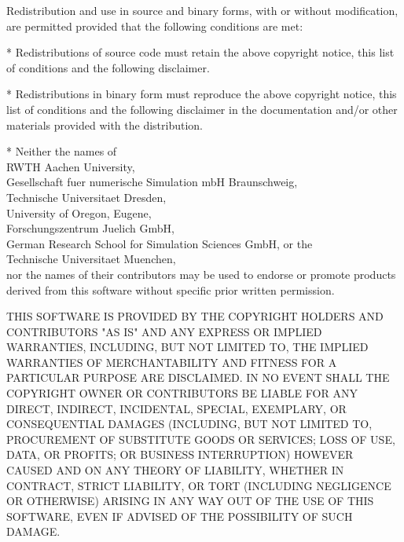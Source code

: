 {\small
Redistribution and use in source and binary forms, with or without
modification, are permitted provided that the following conditions are
met:

* Redistributions of source code must retain the above copyright
  notice, this list of conditions and the following disclaimer.

* Redistributions in binary form must reproduce the above copyright
  notice, this list of conditions and the following disclaimer in the
  documentation and/or other materials provided with the distribution.

* Neither the names of \\ \hspace*{10mm}
   RWTH Aachen University, \\ \hspace*{10mm}
   Gesellschaft fuer numerische Simulation mbH Braunschweig, \\ \hspace*{10mm}
   Technische Universitaet Dresden, \\ \hspace*{10mm}
   University of Oregon, Eugene, \\ \hspace*{10mm}
   Forschungszentrum Juelich GmbH, \\ \hspace*{10mm}
   German Research School for Simulation Sciences GmbH, or the \\ \hspace*{10mm}
   Technische Universitaet Muenchen, \\ \hspace*{10mm}
  nor the names of their contributors may be used to endorse or promote
  products derived from this software without specific prior written
  permission.
  
THIS SOFTWARE IS PROVIDED BY THE COPYRIGHT HOLDERS AND CONTRIBUTORS
"AS IS" AND ANY EXPRESS OR IMPLIED WARRANTIES, INCLUDING, BUT NOT
LIMITED TO, THE IMPLIED WARRANTIES OF MERCHANTABILITY AND FITNESS FOR
A PARTICULAR PURPOSE ARE DISCLAIMED. IN NO EVENT SHALL THE COPYRIGHT
OWNER OR CONTRIBUTORS BE LIABLE FOR ANY DIRECT, INDIRECT, INCIDENTAL,
SPECIAL, EXEMPLARY, OR CONSEQUENTIAL DAMAGES (INCLUDING, BUT NOT
LIMITED TO, PROCUREMENT OF SUBSTITUTE GOODS OR SERVICES; LOSS OF USE,
DATA, OR PROFITS; OR BUSINESS INTERRUPTION) HOWEVER CAUSED AND ON ANY
THEORY OF LIABILITY, WHETHER IN CONTRACT, STRICT LIABILITY, OR TORT
(INCLUDING NEGLIGENCE OR OTHERWISE) ARISING IN ANY WAY OUT OF THE USE
OF THIS SOFTWARE, EVEN IF ADVISED OF THE POSSIBILITY OF SUCH DAMAGE.
}
